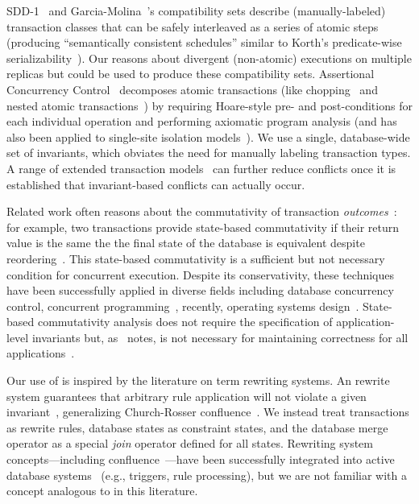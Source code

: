 SDD-1~\cite{sdd1} and Garcia-Molina~\cite{garciamolina-semantics}'s
compatibility sets describe (manually-labeled) transaction classes
that can be safely interleaved as a series of atomic steps (producing
``semantically consistent schedules'' similar to Korth's
predicate-wise serializability~\cite{korth-serializability}). Our
\iconfluence reasons about divergent (non-atomic) executions on
multiple replicas but could be used to produce these compatibility
sets. Assertional Concurrency Control~\cite{decomp-semantics}
decomposes atomic transactions (like chopping~\cite{chopping} and
nested atomic transactions~\cite{atomictransactions}) by requiring
Hoare-style pre- and post-conditions for each individual operation and
performing axiomatic program analysis (and has also been applied to
single-site isolation models~\cite{isolation-semantics}). We use a
single, database-wide set of invariants, which obviates the need for
manually labeling transaction types. A range of extended transaction
models~\cite{acta} can further reduce conflicts once it is established
that invariant-based conflicts can actually occur.

 Related work often reasons about
the commutativity of transaction \textit{outcomes}~\cite{boosting}:
for example, two transactions provide state-based commutativity if
their return value is the same the the final state of the database is
equivalent despite reordering~\cite{weihl-data,weihl-thesis}. This
state-based commutativity is a sufficient but not necessary condition
for concurrent execution. Despite its conservativity, these techniques
have been successfully applied in diverse fields including database
concurrency control, concurrent programming~\cite{boosting}, recently,
operating systems design~\cite{kohler-commutativity}. State-based
commutativity analysis does not require the specification of
application-level invariants but, as~\cite{kohler-commutativity}
notes, is not necessary for maintaining correctness for all
applications~\cite{lamport-audit}.

 Our use of \iconfluence is inspired by the
literature on term rewriting systems. An \iconfluent rewrite system
guarantees that arbitrary rule application will not violate a given
invariant~\cite{obs-confluence}, generalizing Church-Rosser
confluence~\cite{termrewriting}. We instead treat transactions as
rewrite rules, database states as constraint states, and the database
merge operator as a special \textit{join} operator defined for all
states.  Rewriting system concepts---including
confluence~\cite{aiken-confluence}---have been successfully integrated
into active database systems~\cite{activedb-book} (e.g., triggers,
rule processing), but we are not familiar with a concept analogous to
\iconfluence in this literature.


